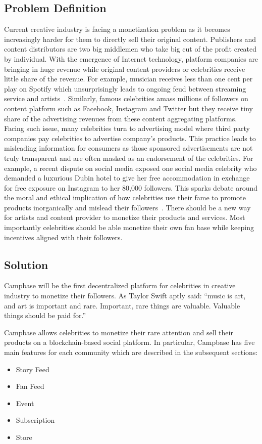 \documentclass[letterpaper,11pt]{article}
\begin{document}
\subsection{Problem Definition}
Current creative industry is facing a monetization problem as it becomes increasingly harder for them to directly sell their original content. Publishers and content distributors are two big middlemen who take big cut of the profit created by individual. With the emergence of Internet technology, platform companies are bringing in huge revenue while original content providers or celebrities receive little share of the revenue. For example, musician receives less than one cent per play on Spotify which unsurprisingly leads to ongoing feud between streaming service and artists~\cite{taylorswiftspotify, jayzspotify}. Similarly, famous celebrities amass millions of followers on content platform such as Facebook, Instagram and Twitter but they receive tiny share of the advertising revenues from these content aggregating platforms. Facing such issue, many celebrities turn to advertising model where third party companies pay celebrities to advertise company's products. This practice leads to misleading information for consumers as those sponsored advertisements are not truly transparent and are often masked as an endorsement of the celebrities. For example, a recent dispute on social media exposed one social media celebrity who demanded a luxurious Dubin hotel to give her free accommodation in exchange for free exposure on Instagram to her 80,000 followers. This sparks debate around the moral and ethical implication of how celebrities use their fame to promote products inorganically and mislead their followers~\cite{dublinban, hotelban}. There should be a new way for artists and content provider to monetize their products and services. Most importantly celebrities should be able monetize their own fan base while keeping incentives aligned with their followers.


\subsection{Solution}
Campbase will be the first decentralized platform for celebrities in creative industry to monetize their followers. As Taylor Swift aptly said: “music is art, and art is important and rare. Important, rare things are valuable. Valuable things should be paid for.”~\cite{taylorswiftspotify}

Campbase allows celebrities to monetize their rare attention and sell their products on a blockchain-based social platform. In particular, Campbase has five main features for each community which are described in the subsequent sections:
\begin{itemize}
\setlength\itemsep{0em}
\item Story Feed
\item Fan Feed
\item Event
\item Subscription
\item Store
\end{itemize}
\end{document}
